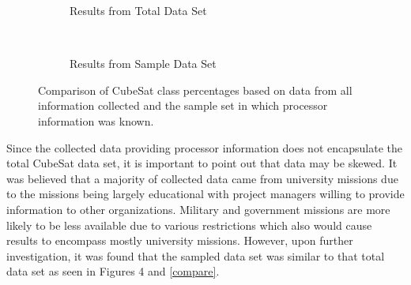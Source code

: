 \documentclass[11pt]{article}
\begin{document}
\begin{figure}[h!]\label{pieclasses}
    \centering
    \begin{subfigure}[t]{0.5\textwidth}
        \centering
        \caption{Results from Total Data Set}
    \end{subfigure}%
    ~ 
    \begin{subfigure}[t]{0.5\textwidth}
        \centering
        \caption{Results from Sample Data Set}
    \end{subfigure}
    \caption{Comparison of CubeSat class percentages based on data from all information collected and the sample set in which processor information was known.}
\end{figure}

Since the collected data providing processor information does not encapsulate the total CubeSat data set, it is important to point out that data may be skewed.  It was believed that a majority of collected data came from university missions due to the missions being largely educational with project managers willing to provide information to other organizations.  Military and government missions are more likely to be less available due to various restrictions which also would cause results to encompass mostly university missions.  However, upon further investigation, it was found that the sampled data set was similar to that total data set as seen in Figures 4 and \ref{compare}. 
\end{document}
